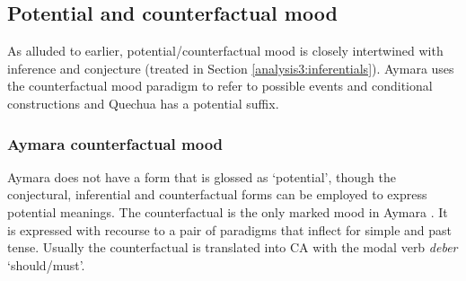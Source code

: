 \documentclass[output=paper,hidelinks]{langscibook}
\begin{document}



\subsection{Potential and counterfactual mood}
\label{analysis4:potentialCF}
As alluded to earlier, potential/counterfactual mood is closely intertwined with inference and conjecture (treated in Section \ref{analysis3:inferentials}). %
Aymara uses the counterfactual mood paradigm to refer to possible events and conditional constructions and Quechua has a potential suffix.



\subsubsection{Aymara counterfactual mood}
Aymara does not have a form that is glossed as `potential', though the conjectural, inferential and counterfactual forms can be employed to express potential meanings. The counterfactual is the only marked mood in Aymara \citep[428]{coler2014grammar}. It is expressed with recourse to a pair of paradigms that inflect for simple and past tense. Usually the counterfactual is translated into CA with the modal verb \textit{deber} `should/must'. 
\end{document}
